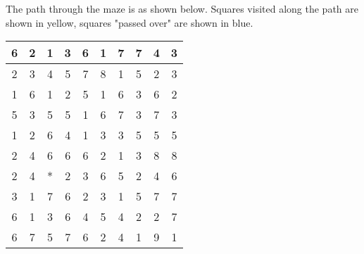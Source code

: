 \documentclass[12pt,letterpaper]{hmcpset}
\begin{document}
\begin{solution}
The path through the maze is as shown below. Squares visited along the path are shown in yellow, squares "passed over"
are shown in blue.

\begin{center}
\begin{tabular}{|c|c|c|c|c|c|c|c|c|c|}
\hline
\cellcolor{yellow}6 & \cellcolor{blue!50}2 & \cellcolor{blue!50}1 & \cellcolor{yellow}3 & 6 & 1 & 7 & 7 & 4 & 3 \\
\hline
\cellcolor{blue!50}2 & 3 & 4 & \cellcolor{blue!50}5 & 7 & 8 & 1 & 5 & 2 & 3 \\
\hline
\cellcolor{blue!50}1 & 6 & 1 & \cellcolor{blue!50}2 & 5 & 1 & 6 & 3 & 6 & 2 \\
\hline
\cellcolor{blue!50}5 & 3 & 5 & \cellcolor{blue!50}5 & 1 & 6 & 7 & 3 & 7 & 3 \\
\hline
\cellcolor{blue!50}1 & 2 & 6 & \cellcolor{yellow}4 & \cellcolor{blue!50}1 & \cellcolor{blue!50}3 & \cellcolor{yellow}3 & 5 & 5 & 5 \\
\hline
\cellcolor{blue!50}2 & 4 & 6 & 6 & 6 & 2 & \cellcolor{yellow}1 & 3 & 8 & 8 \\
\hline
\cellcolor{yellow}2 & \cellcolor{blue!50}4 & \cellcolor{yellow}* & 2 & 3 & 6 & \cellcolor{blue!50}5 & 2 & 4 & 6 \\
\hline
3 & 1 & 7 & 6 & 2 & 3 & \cellcolor{blue!50}1 & 5 & 7 & 7 \\
\hline
6 & 1 & 3 & 6 & 4 & 5 & \cellcolor{blue!50}4 & 2 & 2 & 7 \\
\hline
\cellcolor{yellow}6 & \cellcolor{blue!50}7 & \cellcolor{blue!50}5 & \cellcolor{blue!50}7 & \cellcolor{blue!50}6 & \cellcolor{blue!50}2 & \cellcolor{yellow}4 & 1 & 9 & 1 \\
\hline
\end{tabular}
\end{center}

\vfill
\end{solution}
\newpage
\end{document}
